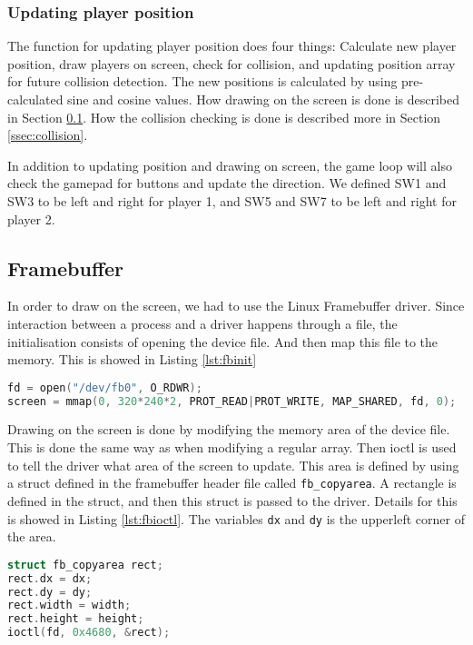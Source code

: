 \subsubsection{Updating player position}
The function for updating player position does four things: Calculate new player position, draw players on screen, check for collision, and updating position array for future collision detection. The new positions is calculated by using pre-calculated sine and cosine values. How drawing on the screen is done is described in Section \ref{ssec:fb}. How the collision checking is done is described more in Section \ref{ssec:collision}.

In addition to updating position and drawing on screen, the game loop will also check the gamepad for buttons and update the direction. We defined SW1 and SW3 to be left and right for player 1, and SW5 and SW7 to be left and right for player 2.

\subsection{Framebuffer} \label{ssec:fb}
In order to draw on the screen, we had to use the Linux Framebuffer driver. Since interaction between a process and a driver happens through a file, the initialisation consists of opening the device file. And then map this file to the memory. This is showed in Listing \ref{lst:fbinit}

\begin{minipage}{\linewidth}
\begin{lstlisting}[language=c, label=lst:fbinit, caption=Initialisation of framebuffer.]
fd = open("/dev/fb0", O_RDWR);
screen = mmap(0, 320*240*2, PROT_READ|PROT_WRITE, MAP_SHARED, fd, 0);
\end{lstlisting}
\end{minipage}

Drawing on the screen is done by modifying the memory area of the device file. This is done the same way as when modifying a regular array. Then ioctl is used to tell the driver what area of the screen to update. This area is defined by using a struct defined in the framebuffer header file called \texttt{fb\_copyarea}. A rectangle is defined in the struct, and then this struct is passed to the driver. Details for this is showed in Listing \ref{lst:fbioctl}. The variables \texttt{dx} and \texttt{dy} is the upperleft corner of the area.

\begin{minipage}{\linewidth}
\begin{lstlisting}[language=c, label=lst:fbioctl, caption=Communication with the framebuffer driver.]
struct fb_copyarea rect;
rect.dx = dx;
rect.dy = dy;
rect.width = width;
rect.height = height;
ioctl(fd, 0x4680, &rect);
\end{lstlisting}
\end{minipage}

